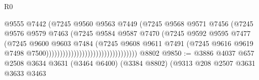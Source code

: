 \begin{lexlean}{R0}
\begin{coremodule}
                                                      @9555
                                                      @7442
                                                      (@7245
                                                        @9560
                                                        @9563
                                                        @7449
                                                        (@7245
                                                          @9568
                                                          @9571
                                                          @7456
                                                          (@7245
                                                            @9576
                                                            @9579
                                                            @7463
                                                            (@7245
                                                              @9584
                                                              @9587
                                                              @7470
                                                              (@7245
                                                                @9592
                                                                @9595
                                                                @7477
                                                                (@7245
                                                                  @9600
                                                                  @9603
                                                                  @7484
                                                                  (@7245
                                                                    @9608
                                                                    @9611
                                                                    @7491
                                                                    (@7245
                                                                      @9616
                                                                      @9619
                                                                      @7498
                                                                      @7500)))))))))))))))))))))))))))))))))
    @8802
@9850 := @3886
    @4037
    @657
    @2508
    @3634
    @3631
    (@3464 @6400)
    (@3384 @8802)
    (@9313
      @208
      @2507
      @3631
      @3633
      @3463

\end{coremodule}
\end{lexlean}
